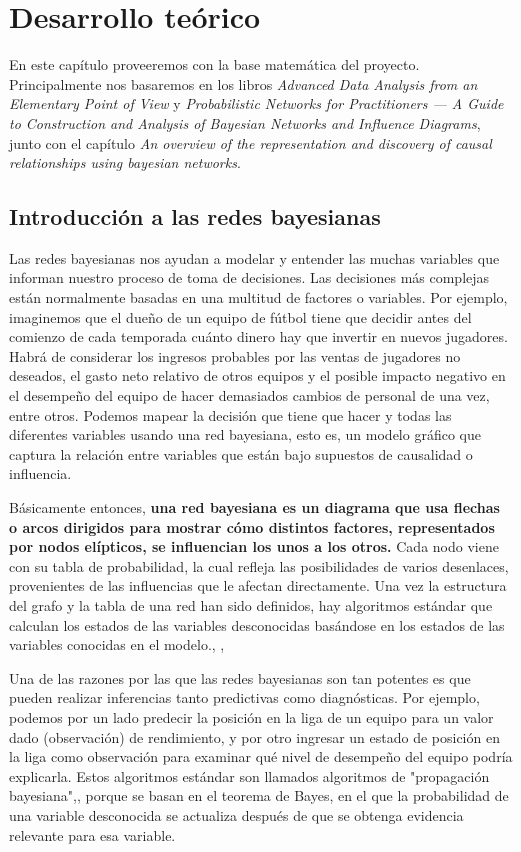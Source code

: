 \chapter{Desarrollo teórico}
En este capítulo proveeremos con la base matemática del proyecto. Principalmente nos basaremos en 
los libros \textit{Advanced Data Analysis
from an Elementary Point of View}\cite{ada} y \textit{Probabilistic Networks for Practitioners — A
Guide to Construction and Analysis of Bayesian
Networks and Influence Diagrams}\cite{pgm}, junto con el capítulo \textit{An overview of the representation and 
discovery of causal relationships using bayesian networks}\cite{cooper}.

\section{Introducción a las redes bayesianas}
Las redes bayesianas nos ayudan a modelar y entender las muchas variables que informan nuestro proceso de 
toma de decisiones. Las decisiones más complejas están normalmente basadas en una multitud de factores o 
variables. Por ejemplo, imaginemos que el dueño de un equipo de fútbol tiene que decidir antes del comienzo 
de cada temporada cuánto dinero hay que invertir en nuevos jugadores. Habrá de considerar los ingresos 
probables por las ventas de jugadores no deseados, el gasto neto relativo de otros
equipos y el posible impacto negativo en el desempeño del equipo de hacer demasiados cambios de personal de una 
vez, entre otros. Podemos mapear la decisión que tiene que hacer y todas las diferentes variables usando 
una red bayesiana, esto es, un modelo gráfico que captura la relación entre variables que están bajo 
supuestos de causalidad o influencia.\cite{things-to-know-BN}

Básicamente entonces, \textbf{una red bayesiana es un diagrama que 
usa flechas o arcos dirigidos para mostrar cómo distintos factores, representados por nodos elípticos, se 
influencian los unos a los otros.} Cada nodo viene con su tabla de probabilidad, la cual refleja las 
posibilidades de varios desenlaces, provenientes de las influencias que le afectan directamente. Una vez 
la estructura del grafo y la tabla de una red han sido definidos, hay algoritmos estándar que 
calculan los estados de las variables desconocidas basándose en los estados de las variables conocidas en el
modelo.\cite{learning-algorithms-BN-comparison}, \cite{BN-achilles-heel}, \cite{different-algorithmic-schemes}

Una de las razones por las que las redes bayesianas son tan potentes es que pueden realizar inferencias 
tanto predictivas como diagnósticas. Por ejemplo, podemos por un lado predecir la posición en la liga de un equipo para 
un valor dado (observación) de rendimiento, y por otro ingresar un estado de posición en la 
liga como observación para examinar qué nivel de desempeño del equipo podría explicarla. Estos algoritmos estándar son
llamados algoritmos de "propagación bayesiana"\cite{Cano2004},\cite{more-algorithms}, \cite{back-prop} porque se basan en el teorema de Bayes, en el que la 
probabilidad de una variable desconocida se actualiza después de que se obtenga evidencia relevante para esa variable.\cite{prop-alg}

